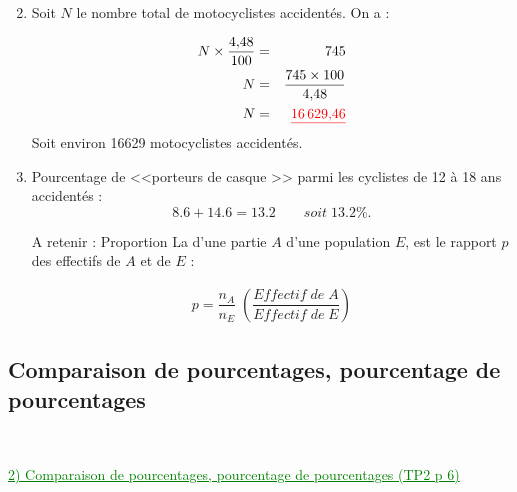 \documentclass[xcolor={dvipsnames}]{beamer}
\begin{document}
\begin{frame}{}
	\begin{enumerate}%
		\setcounter{enumi}{1}
		\item Soit $N$ le nombre total de motocyclistes accidentés. On a :\pause
		
		\begin{eqnarray*}
			N \times \dfrac{\num{4.48}}{100} &=& 745 \\
			N &=& \dfrac{745 \times 100}{\num{4.48}} \\
			N &=&  \textcolor{red}{\underline{\textbf{\num{16629.46}}}}
		\end{eqnarray*}
		Soit environ \num{16629} motocyclistes accidentés.
			
	\end{enumerate}
\end{frame}

\begin{frame}{}
\begin{enumerate}%
	\setcounter{enumi}{2}
		\item Pourcentage de <<porteurs de casque >> parmi les cyclistes de 12 à 18 ans accidentés :
		\begin{equation*}
		\num{8.6} + \num{14.6} = \num{13.2} \qquad soit \; \num{13.2}\%.
		\end{equation*}\pause
		
	\begin{alertblock}{A retenir : Proportion}
		La  d'une partie $A$ d'une population $E$, est le rapport $p$ des effectifs de $A$ et de $E$ :
		
		\begin{eqnarray*}
			p = \dfrac{n_A}{n_E} \; \left(\dfrac{Effectif\;de\; A}{Effectif\; de\; E}\right)
		\end{eqnarray*}
	\end{alertblock}
\end{enumerate}
\end{frame}		


\subsection{Comparaison de pourcentages, pourcentage de pourcentages}


\begin{frame}
\


\textcolor{Green}{\underline{2) Comparaison de pourcentages, pourcentage de pourcentages (TP2 p 6)}}
\end{frame}
\end{document}
